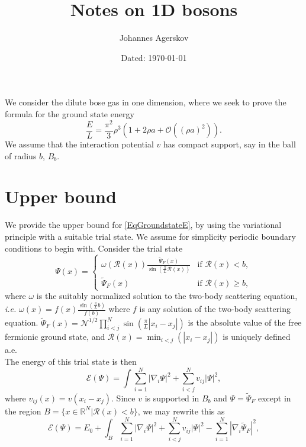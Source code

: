 \documentclass[a4paper,11pt]{article}
\author{Johannes Agerskov}
\date{Dated: \today}
\title{Notes on 1D bosons}
\newcommand{\abs}[1]{\left\lvert #1 \right\rvert}
\newcommand{\ie}{\emph{i.e.} }
\newcommand{\R}{\mathbb{R}}
\newcommand{\rr}{\mathcal{R}}
\numberwithin{equation}{section}
\begin{document}
	\maketitle
	We consider the dilute bose gas in one dimension, where we seek to prove the formula for the ground state energy \begin{equation}\label{EqGroundstateE}
	\frac{E}{L}=\frac{\pi^2}{3}\rho^3\left(1+2\rho a+ \mathcal{O}\left((\rho a)^2\right)\right).
	\end{equation} 
	We assume that the interaction potential $ v $ has compact support, say in the ball of radius $ b $, $ B_b $.
	\section{Upper bound}
	We provide the upper bound for \eqref{EqGroundstateE}, by using the variational principle with a suitable trial state. We assume for simplicity periodic boundary conditions to begin with.
	 Consider the trial state\begin{equation}
	\Psi(x)=\begin{cases}
	\omega(\rr(x))\frac{\tilde{\Psi}_F(x)}{\sin\left(\frac{\pi}{L}\rr(x)\right)}& \text{if }\rr(x)<b,\\
	\tilde{\Psi}_F(x)&\text{if }\rr(x)\geq b,
	\end{cases}
	\end{equation}
	where $ \omega $ is the suitably normalized solution to the two-body scattering equation, \ie $ \omega(x)=f(x)\frac{\sin\left(\frac{\pi}{L}b\right)}{f(b)} $ where $ f $ is any solution of the two-body scattering equation.  $ \tilde{\Psi}_F(x)=\mathcal{N}^{1/2}\prod_{i<j}^{N}\sin\left(\frac{\pi}{L}\abs{x_i-x_j}\right) $ is the absolute value of the free fermionic ground state, and $ \rr(x)=\min_{i<j}(\abs{x_i-x_j}) $ is uniquely defined a.e.\\
	The energy of this trial state is then\begin{equation}
	\mathcal{E}(\Psi)=\int \sum_{i=1}^{N}\abs{\nabla_i\Psi}^2+\sum_{i<j}^{N}v_{ij}\abs{\Psi}^2,
	\end{equation}
	where $ v_{ij}(x)=v(x_i-x_j) $. Since $ v $ is supported in $ B_b $ and $ \Psi=\tilde{\Psi}_F $ except in the region $ B=\{x\in\R^N \vert \rr(x)<b \} $, we may rewrite this as \begin{equation}
	\mathcal{E}(\Psi)=E_0+\int_B \sum_{i=1}^{N}\abs{\nabla_i\Psi}^2+\sum_{i<j}^{N}v_{ij}\abs{\Psi}^2-\sum_{i=1}^{N}\abs{\nabla_i\tilde{\Psi}_F}^2,
	\end{equation}
\end{document}

